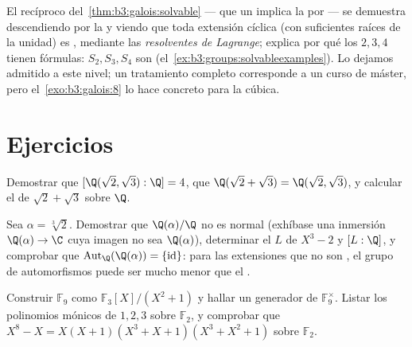 \begin{remark}\label{rem:b3:galois:converse}
El recíproco del~\cref{thm:b3:galois:solvable} --- que un
 implica la
 por
 --- se demuestra descendiendo
por la  y viendo que toda
extensión cíclica (con suficientes raíces de la unidad) es
, mediante las \emph{resolventes
de Lagrange}; explica por qué los
 $2, 3, 4$ tienen fórmulas:
$S_2, S_3, S_4$ son 
(el~\cref{ex:b3:groups:solvableexamples}). Lo dejamos admitido a este
nivel; un tratamiento completo corresponde a un curso de máster, pero
el~\cref{exo:b3:galois:8} lo hace concreto para la cúbica.
\end{remark}

\section{Ejercicios}

\begin{exercise}[$\star$]\label{exo:b3:galois:1}
Demostrar que $[\Q(\sqrt2, \sqrt3):\Q] = 4$, que $\Q(\sqrt2 + \sqrt3) =
\Q(\sqrt2, \sqrt3)$, y calcular el
 de $\sqrt2 + \sqrt3$
sobre $\Q$.
\end{exercise}

\begin{exercise}[$\star$]\label{exo:b3:galois:2}
Sea $\alpha = \sqrt[3]2$. Demostrar que $\Q(\alpha)/\Q$ no es normal
(exhíbase una inmersión $\Q(\alpha) \to \C$ cuya imagen no sea
$\Q(\alpha)$), determinar el  $L$ de $X^3 -
2$ y $[L:\Q]$, y comprobar que $\operatorname{Aut}_\Q(\Q(\alpha)) =
\{\mathrm{id}\}$: para las extensiones que
no son , el grupo de automorfismos puede ser mucho menor que
el .
\end{exercise}

\begin{exercise}[$\star$]\label{exo:b3:galois:3}
Construir $\mathbb F_9$ como $\mathbb F_3[X]/(X^2+1)$ y hallar un
generador de $\mathbb F_9^\times$. Listar los polinomios mónicos
 de
 $1, 2, 3$ sobre $\mathbb F_2$,
y comprobar que $X^8 - X = X(X+1)(X^3+X+1)(X^3+X^2+1)$ sobre
$\mathbb F_2$.
\end{exercise}

